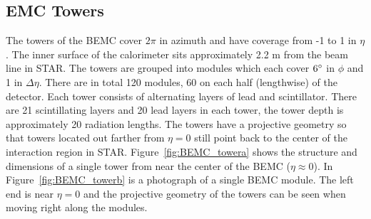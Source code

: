 \subsection{EMC Towers}

The towers of the BEMC cover $2\pi$ in azimuth and have coverage from -1 to 1 in $\eta$. The inner surface of the calorimeter sits approximately 2.2 m from the beam line in STAR. The towers are grouped into modules which each cover $6\degree$ in $\phi$ and 1 in $\Delta\eta$. There are in total 120 modules, 60 on each half (lengthwise) of the detector. Each tower consists of alternating layers of lead and scintillator. There are 21 scintillating layers and 20 lead layers in each tower, the tower depth is approximately 20 radiation lengths. The towers have a projective geometry so that towers located out farther from $\eta = 0$ still point back to the center of the interaction region in STAR. Figure~\ref{fig:BEMC_towera} shows the structure and dimensions of a single tower from near the center of the BEMC ($\eta \approx 0$). In Figure~\ref{fig:BEMC_towerb} is a photograph of a single BEMC module. The left end is near $\eta = 0$ and the projective geometry of the towers can be seen when moving right along the modules.


